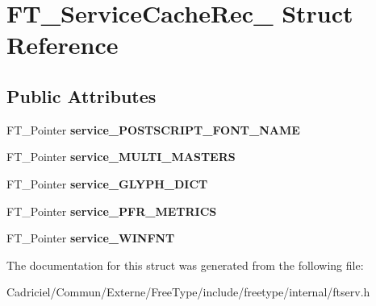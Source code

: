 \hypertarget{struct_f_t___service_cache_rec__}{\section{F\-T\-\_\-\-Service\-Cache\-Rec\-\_\- Struct Reference}
\label{struct_f_t___service_cache_rec__}
}
\subsection*{Public Attributes}
\begin{DoxyCompactItemize}
\item 
\hypertarget{struct_f_t___service_cache_rec___a1b95ee574621c8b031fe239d449bfa5c}{F\-T\-\_\-\-Pointer {\bfseries service\-\_\-\-P\-O\-S\-T\-S\-C\-R\-I\-P\-T\-\_\-\-F\-O\-N\-T\-\_\-\-N\-A\-M\-E}}\label{struct_f_t___service_cache_rec___a1b95ee574621c8b031fe239d449bfa5c}

\item 
\hypertarget{struct_f_t___service_cache_rec___abf51ac75b59eeac29ad5e4bbbc50e749}{F\-T\-\_\-\-Pointer {\bfseries service\-\_\-\-M\-U\-L\-T\-I\-\_\-\-M\-A\-S\-T\-E\-R\-S}}\label{struct_f_t___service_cache_rec___abf51ac75b59eeac29ad5e4bbbc50e749}

\item 
\hypertarget{struct_f_t___service_cache_rec___af8bbf442f497ad21666069ec33aaa88a}{F\-T\-\_\-\-Pointer {\bfseries service\-\_\-\-G\-L\-Y\-P\-H\-\_\-\-D\-I\-C\-T}}\label{struct_f_t___service_cache_rec___af8bbf442f497ad21666069ec33aaa88a}

\item 
\hypertarget{struct_f_t___service_cache_rec___ac5d029d7f442e8b727c40d5a88faa344}{F\-T\-\_\-\-Pointer {\bfseries service\-\_\-\-P\-F\-R\-\_\-\-M\-E\-T\-R\-I\-C\-S}}\label{struct_f_t___service_cache_rec___ac5d029d7f442e8b727c40d5a88faa344}

\item 
\hypertarget{struct_f_t___service_cache_rec___abb824452cfb20932fbd22405323781f9}{F\-T\-\_\-\-Pointer {\bfseries service\-\_\-\-W\-I\-N\-F\-N\-T}}\label{struct_f_t___service_cache_rec___abb824452cfb20932fbd22405323781f9}

\end{DoxyCompactItemize}


The documentation for this struct was generated from the following file\-:\begin{DoxyCompactItemize}
\item 
Cadriciel/\-Commun/\-Externe/\-Free\-Type/include/freetype/internal/ftserv.\-h\end{DoxyCompactItemize}
